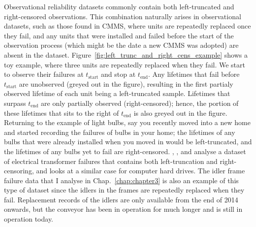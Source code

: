 Observational reliability datasets commonly contain both left-truncated and right-censored observations. This combination naturally arises in observational datasets, such as those found in CMMS, where units are repeatedly replaced once they fail, and any units that were installed and failed before the start of the observation process (which might be the date a new CMMS was adopted) are absent in the dataset. Figure~\ref{fig:left_trunc_and_right_cens_example} shows a toy example, where three units are repeatedly replaced when they fail. We start to observe their failures at $t_{\text{start}}$ and stop at $t_{\text{end}}$. Any lifetimes that fail before $t_{\text{start}}$ are unobserved (greyed out in the figure), resulting in the first partialy observed lifetime of each unit being a left-truncated sample. Lifetimes that surpass $t_{\text{end}}$ are only partially observed (right-censored); hence, the portion of these lifetimes that sits to the right of $t_{\text{end}}$ is also greyed out in the figure. Returning to the example of light bulbs, say you recently moved into a new home and started recording the failures of bulbs in your home; the lifetimes of any bulbs that were already installed when you moved in would be left-truncated, and the lifetimes of any bulbs yet to fail are right-censored. \citet{hong2009}, \citet{mitra2013}, and \citet{kundu2016} analyse a dataset of electrical transformer failures that contains both left-truncation and right-censoring, and \citet{mittman2013} looks at a similar case for computer hard drives. The idler frame failure data that I analyse in Chap.~\ref{chap:chapter3} is also an example of this type of dataset since the idlers in the frames are repeatedly replaced when they fail. Replacement records of the idlers are only available from the end of 2014 onwards, but the conveyor has been in operation for much longer and is still in operation today.

